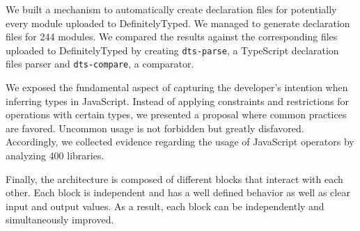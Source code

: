 \documentclass[a4paper,english,cleveref, autoref]{lipics-v2019}
\begin{document}
We built a mechanism to automatically create declaration files for potentially every module uploaded to DefinitelyTyped. We managed to generate declaration files for 244 modules. We compared the results against the corresponding files uploaded to DefinitelyTyped by creating \texttt{dts-parse}, a TypeScript declaration files parser and \texttt{dts-compare}, a comparator.

We exposed the fundamental aspect of capturing the developer's intention when inferring types in JavaScript. Instead of applying constraints and restrictions for operations with certain types, we presented a proposal where common practices are favored. Uncommon usage is not forbidden but greatly disfavored. Accordingly, we collected evidence regarding the usage of JavaScript operators by analyzing 400 libraries.

Finally, the architecture is composed of different blocks that interact with each other. Each block is independent and has a well defined behavior as well as clear input and output values. As a result, each block can be independently and simultaneously improved.



\end{document}
